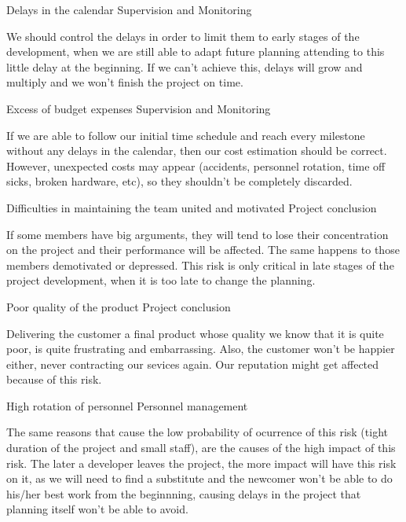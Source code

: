 \begin{risk}[riskDelays]{Delays in the calendar}
\riskcat Supervision and Monitoring

We should control the delays in order to limit them to early stages of the development, when we are still able to adapt future planning attending to this little delay at the beginning. If we can't achieve this, delays will grow and multiply and we won't finish the project on time.
\end{risk}

\begin{risk}[riskBudget]{Excess of budget expenses}
\riskcat Supervision and Monitoring

If we are able to follow our initial time schedule and reach every milestone without any delays in the calendar, then our cost estimation should be correct. However, unexpected costs may appear (accidents, personnel rotation, time off sicks, broken hardware, etc), so they shouldn't be completely discarded.
\end{risk}

\begin{risk}[riskMotivation]{Difficulties in maintaining the team united and motivated}
\riskcat Project conclusion

If some members have big arguments, they will tend to lose their concentration on the project and their performance will be affected. The same happens to those members demotivated or depressed. This risk is only critical in late stages of the project development, when it is too late to change the planning.
\end{risk}

\begin{risk}[riskQuality]{Poor quality of the product}
\riskcat Project conclusion

Delivering the customer a final product whose quality we know that it is quite poor, is quite frustrating and embarrassing. Also, the customer won't be happier either, never contracting our sevices again. Our reputation might get affected because of this risk.
\end{risk}

\begin{risk}[riskPersonnelRotation]{High rotation of personnel}
\riskcat Personnel management

The same reasons that cause the low probability of ocurrence of this risk (tight duration of the project and small staff), are the causes of the high impact of this risk. The later a developer leaves the project, the more impact will have this risk on it, as we will need to find a substitute and the newcomer won't be able to do his/her best work from the beginnning, causing delays in the project that planning itself won't be able to avoid.
\end{risk}

